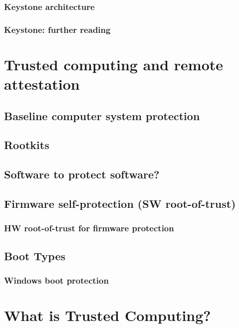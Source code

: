 \subsubsection{Keystone architecture}

\subsubsection{Keystone: further reading}


\section{Trusted computing and remote attestation}

\subsection{Baseline computer system protection}

\subsection{Rootkits}


\subsection{Software to protect software?}


\subsection{Firmware self-protection (SW root-of-trust)}

\subsubsection{HW root-of-trust for firmware protection}

\subsection{Boot Types}

\subsubsection{Windows boot protection}


\section{What is Trusted Computing?}

